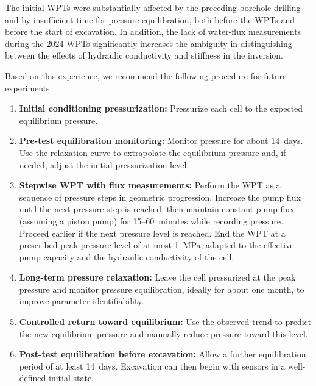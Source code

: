 The initial WPTs were substantially affected by the preceding borehole drilling and
by insufficient time for pressure equilibration, both before the WPTs and before the
start of excavation. In addition, the lack of water-flux measurements during the
2024 WPTs significantly increases the ambiguity in distinguishing between the
effects of hydraulic conductivity and stiffness in the inversion.

Based on this experience, we recommend the following procedure for future
experiments:
\begin{enumerate}
\item \textbf{Initial conditioning pressurization:} Pressurize each cell to the
expected equilibrium pressure.
\item \textbf{Pre-test equilibration monitoring:} Monitor pressure for about
14~days. Use the relaxation curve to extrapolate the equilibrium pressure and, if
needed, adjust the initial pressurization level.
\item \textbf{Stepwise WPT with flux measurements:} Perform the WPT as a sequence of
pressure steps in geometric progression. Increase the pump flux until the next
pressure step is reached, then maintain constant pump flux (assuming a piston pump) for
15--60~minutes while recording pressure. Proceed earlier if the next pressure level
is reached. End the WPT at a prescribed peak pressure level of at most 1~MPa, adapted
to the effective pump capacity and the hydraulic conductivity of the cell.
\item \textbf{Long-term pressure relaxation:} Leave the cell pressurized at the
peak pressure and monitor pressure equilibration, ideally for about one month, to
improve parameter identifiability.
\item \textbf{Controlled return toward equilibrium:} Use the observed trend to
predict the new equilibrium pressure and manually reduce pressure toward this level.
\item \textbf{Post-test equilibration before excavation:} Allow a further
equilibration period of at least 14~days. Excavation can then begin with sensors in a
well-defined initial state.
\end{enumerate}


